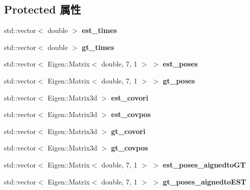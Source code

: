 \subsection*{Protected 属性}
\begin{DoxyCompactItemize}
\item 
\mbox{\label{classov__eval_1_1ResultTrajectory_a2e78209342b80d1ac3115bad38ef397c}} 
std\+::vector$<$ double $>$ {\bfseries est\+\_\+times}
\item 
\mbox{\label{classov__eval_1_1ResultTrajectory_a7d985814985338546e06b9a5a49b153e}} 
std\+::vector$<$ double $>$ {\bfseries gt\+\_\+times}
\item 
\mbox{\label{classov__eval_1_1ResultTrajectory_af603360e09c66c552f08f144aa399b4b}} 
std\+::vector$<$ Eigen\+::\+Matrix$<$ double, 7, 1 $>$ $>$ {\bfseries est\+\_\+poses}
\item 
\mbox{\label{classov__eval_1_1ResultTrajectory_a27988db61fab2b6154665c5cf5f5eb66}} 
std\+::vector$<$ Eigen\+::\+Matrix$<$ double, 7, 1 $>$ $>$ {\bfseries gt\+\_\+poses}
\item 
\mbox{\label{classov__eval_1_1ResultTrajectory_a80f44e2b04fafe8114962438abe9164a}} 
std\+::vector$<$ Eigen\+::\+Matrix3d $>$ {\bfseries est\+\_\+covori}
\item 
\mbox{\label{classov__eval_1_1ResultTrajectory_a4b3adeb0603f3197484be750db827b39}} 
std\+::vector$<$ Eigen\+::\+Matrix3d $>$ {\bfseries est\+\_\+covpos}
\item 
\mbox{\label{classov__eval_1_1ResultTrajectory_add4899b2111a01e8e3ea9d29618b0ce4}} 
std\+::vector$<$ Eigen\+::\+Matrix3d $>$ {\bfseries gt\+\_\+covori}
\item 
\mbox{\label{classov__eval_1_1ResultTrajectory_a32637a737e1bb09cfe0d6e71fa3d8ccd}} 
std\+::vector$<$ Eigen\+::\+Matrix3d $>$ {\bfseries gt\+\_\+covpos}
\item 
\mbox{\label{classov__eval_1_1ResultTrajectory_a9dfef04471027bb002081c55674e41d9}} 
std\+::vector$<$ Eigen\+::\+Matrix$<$ double, 7, 1 $>$ $>$ {\bfseries est\+\_\+poses\+\_\+aignedto\+GT}
\item 
\mbox{\label{classov__eval_1_1ResultTrajectory_a39957e134124c8f5cc61522df94a03fe}} 
std\+::vector$<$ Eigen\+::\+Matrix$<$ double, 7, 1 $>$ $>$ {\bfseries gt\+\_\+poses\+\_\+aignedto\+E\+ST}
\end{DoxyCompactItemize}



